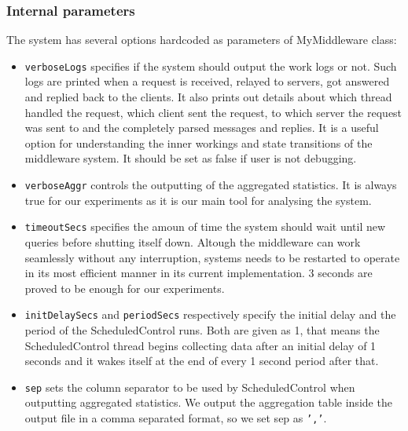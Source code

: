 \documentclass[11pt,a4paper]{article}
\begin{document}
\subsubsection{Internal parameters} \label{sec:ov-internalparameters}
The system has several options hardcoded as parameters of MyMiddleware class:
\begin{itemize}
\item \texttt{verboseLogs} specifies if the system should output the work logs or not. Such logs are printed when a request is received, relayed to servers, got answered and replied back to the clients. It also prints out details about which thread handled the request, which client sent the request, to which server the request was sent to and the completely parsed messages and replies. It is a useful option for understanding the inner workings and state transitions of the middleware system. It should be set as false if user is not debugging.
\item \texttt{verboseAggr} controls the outputting of the aggregated statistics. It is always true for our experiments as it is our main tool for analysing the system.
\item \texttt{timeoutSecs} specifies the amoun of time the system should wait until new queries before shutting itself down. Altough the middleware can work seamlessly without any interruption, systems needs to be restarted to operate in its most efficient manner in its current implementation. 3 seconds are proved to be enough for our experiments.
\item \texttt{initDelaySecs} and \texttt{periodSecs} respectively specify the initial delay and the period of the ScheduledControl runs. Both are given as 1, that means the ScheduledControl thread begins collecting data after an initial delay of 1 seconds and it wakes itself at the end of every 1 second period after that.
\item \texttt{sep} sets the column separator to be used by ScheduledControl when outputting aggregated statistics. We output the aggregation table inside the output file in a comma separated format, so we set sep as \texttt{','}.
\end{itemize}
\end{document}
